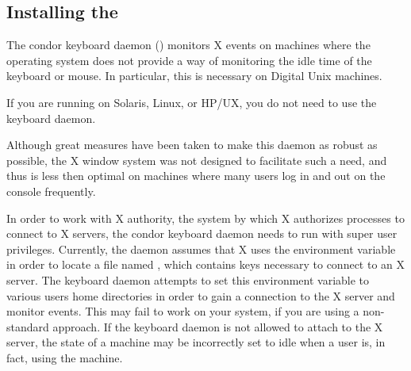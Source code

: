 \subsection{\label{sec:kbdd}Installing the }

The condor keyboard daemon () monitors X events on
machines where the operating system does not provide a way of
monitoring the idle time of the keyboard or mouse.  In particular,
this is necessary on Digital Unix machines.

\Note If you are running on Solaris, Linux, or HP/UX, you do
not need to use the keyboard daemon.

Although great measures have been taken to make this daemon as robust
as possible, the X window system was not designed to facilitate such a
need, and thus is less then optimal on machines where many users log
in and out on the console frequently.

In order to work with X authority, the system by which X authorizes
processes to connect to X servers, the condor keyboard daemon needs to
run with super user privileges.  Currently, the daemon assumes that X
uses the  environment variable in order to locate a file
named , which contains keys necessary to connect to
an X server.  The keyboard daemon attempts to set this environment
variable to various users home directories in order to gain a
connection to the X server and monitor events.  This may fail to work
on your system, if you are using a non-standard approach.  If the
keyboard daemon is not allowed to attach to the X server, the state of
a machine may be incorrectly set to idle when a user is, in fact,
using the machine.

